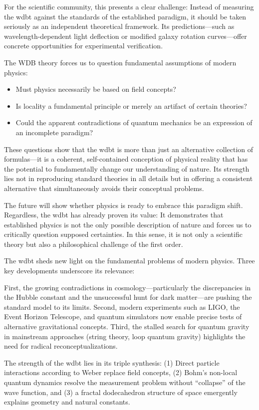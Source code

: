 \documentclass[11pt, a5paper, twoside, openright]{book}
\begin{document}
For the scientific community, this presents a clear challenge: Instead of measuring the \gls{wdbt} against the standards of the established paradigm, it should be taken seriously
as an independent theoretical framework. Its predictions—such as wavelength-dependent light deflection or modified galaxy rotation curves—offer concrete opportunities for experimental verification.

The WDB theory forces us to question fundamental assumptions of modern physics:
\begin{itemize}
    \item Must physics necessarily be based on field concepts?
    \item Is locality a fundamental principle or merely an artifact of certain theories?
    \item Could the apparent contradictions of quantum mechanics be an expression of an incomplete paradigm?
\end{itemize}
These questions show that the \gls{wdbt} is more than just an alternative collection of formulas—it is a coherent, self-contained conception of physical reality
that has the potential to fundamentally change our understanding of nature. Its strength lies not in reproducing standard theories in all details but in offering
a consistent alternative that simultaneously avoids their conceptual problems.

The future will show whether physics is ready to embrace this paradigm shift. Regardless, the \gls{wdbt} has already proven its value: It demonstrates
that established physics is not the only possible description of nature and forces us to critically question supposed certainties. In this sense, it is not
only a scientific theory but also a philosophical challenge of the first order.

The \gls{wdbt} sheds new light on the fundamental problems of modern physics. Three key developments underscore its relevance:

First, the growing contradictions in cosmology—particularly the discrepancies in the Hubble constant and the unsuccessful hunt for dark matter—are pushing the standard model
to its limits. Second, modern experiments such as LIGO, the Event Horizon Telescope, and quantum simulators now enable precise tests of alternative
gravitational concepts. Third, the stalled search for quantum gravity in mainstream approaches (string theory, loop quantum gravity) highlights the need for
radical reconceptualizations.

The strength of the \gls{wdbt} lies in its triple synthesis:
(1) Direct particle interactions according to Weber replace field concepts, (2) Bohm's non-local quantum dynamics resolve the measurement problem without \enquote{collapse} of the wave function,
and (3) a fractal dodecahedron structure of space emergently explains geometry and natural constants.
\end{document}
